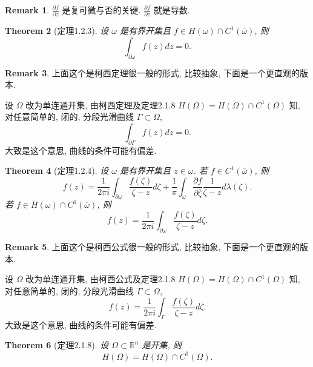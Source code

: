 \documentclass[a4paper,11pt]{article}
\newtheorem{theorem}{Theorem}[section]
\theoremstyle{definition}
\newtheorem{remark}[theorem]{Remark}
\begin{document}
\begin{CJK*}{UTF8}{gbsn}
\begin{remark}
    $ \frac{\partial f}{\partial \overline{z}} $ 是复可微与否的关键.
    $ \frac{\partial f}{\partial z} $ 就是导数.
\end{remark}

\begin{theorem}[定理1.2.3]
    设 $ \omega $ 是有界开集且 $ f \in H(\omega) \cap C^1(\overline{\omega}) $, 则
    $$
        \int_{\partial \omega} f(z) dz = 0.
    $$
\end{theorem}

\begin{remark}
    上面这个是柯西定理很一般的形式, 比较抽象, 下面是一个更直观的版本.
    
    设 $ \Omega $ 改为单连通开集, 由柯西定理及定理2.1.8 $ H(\Omega) = H(\Omega) \cap C^1(\Omega) $ 知, 
    对任意简单的, 闭的, 分段光滑曲线 $ \Gamma \subset \Omega $,
    $$
        \int_{\partial \Gamma} f(z) dz = 0.
    $$
    大致是这个意思, 曲线的条件可能有偏差.
\end{remark}

\begin{theorem}[定理1.2.4] \label{1.2.4}
    设 $ \omega $ 是有界开集且 $ z \in \omega $. 若 $ f \in C^1(\overline{\omega}) $, 则
    $$
        f(z) = \frac{1}{2 \pi i} \int_{\partial \omega} \frac{f(\zeta)}{ \zeta - z} d\zeta
                + \frac{1}{\pi} \int_{\omega} \frac{\partial f}{\partial \overline{\zeta}} 
                    \frac{1}{ \zeta - z} d\lambda(\zeta).
    $$
    若 $ f \in H(\omega) \cap C^1(\overline{\omega}) $, 则
    $$
        f(z) = \frac{1}{2 \pi i} \int_{\partial \omega} \frac{f(\zeta)}{ \zeta - z} d\zeta.
    $$
\end{theorem}

\begin{remark}
    上面这个是柯西公式很一般的形式, 比较抽象, 下面是一个更直观的版本.
        
    设 $ \Omega $ 改为单连通开集, 由柯西公式及定理2.1.8 $ H(\Omega) = H(\Omega) \cap C^1(\Omega) $ 知, 
    对任意简单的, 闭的, 分段光滑曲线 $ \Gamma \subset \Omega $,
    $$
        f(z) = \frac{1}{2 \pi i} \int_{\Gamma} \frac{f(\zeta)}{ \zeta - z} d\zeta.
    $$
    大致是这个意思, 曲线的条件可能有偏差.
\end{remark}

\begin{theorem}[定理2.1.8] \label{2.1.8}
    设 $ \Omega \subset \mathbb{R}^n $ 是开集, 则
    $$
        H(\Omega) = H(\Omega) \cap C^1(\Omega).
    $$
\end{theorem}


\end{CJK*}
\end{document}
